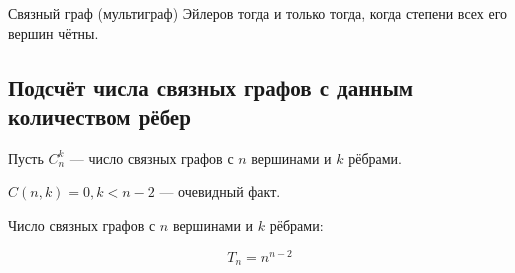 \begin{thm}
Связный граф (мультиграф) Эйлеров тогда и только тогда, когда степени всех его вершин чётны.
\end{thm}


\subsection{Подсчёт числа связных графов с данным количеством рёбер}

Пусть $C^k_n$ --- число связных графов с $n$ вершинами и $k$ рёбрами.

$C(n,k) = 0, k < n-2$ --- очевидный факт.

\begin{keli}
Число связных графов с $n$ вершинами и $k$ рёбрами:

\[T_n = n^{n-2}\]

\end{keli}
